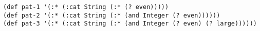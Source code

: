 \begin{lstlisting}[style=reclojureClojure]
(def pat-1 '(:* (:cat String (:* (? even)))))
(def pat-2 '(:* (:cat String (:* (and Integer (? even))))))
(def pat-3 '(:* (:cat String (:* (and Integer (? even) (? large))))))
\end{lstlisting}
